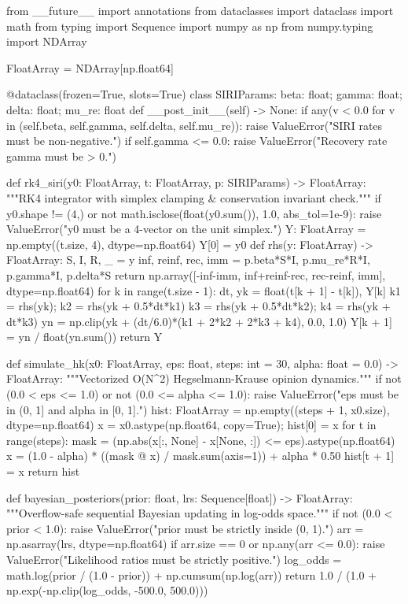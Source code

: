 \begin{ltrcode}[title={CivicShield AI -- Hardened Simulation Core (Python 3.11+ / NumPy)}]
from __future__ import annotations
from dataclasses import dataclass
import math
from typing import Sequence
import numpy as np
from numpy.typing import NDArray

FloatArray = NDArray[np.float64]

@dataclass(frozen=True, slots=True)
class SIRIParams:
    beta: float; gamma: float; delta: float; mu_re: float
    def __post_init__(self) -> None:
        if any(v < 0.0 for v in (self.beta, self.gamma, self.delta, self.mu_re)):
            raise ValueError("SIRI rates must be non-negative.")
        if self.gamma <= 0.0:
            raise ValueError("Recovery rate gamma must be > 0.")

def rk4_siri(y0: FloatArray, t: FloatArray, p: SIRIParams) -> FloatArray:
    """RK4 integrator with simplex clamping & conservation invariant check."""
    if y0.shape != (4,) or not math.isclose(float(y0.sum()), 1.0, abs_tol=1e-9):
        raise ValueError("y0 must be a 4-vector on the unit simplex.")
    Y: FloatArray = np.empty((t.size, 4), dtype=np.float64)
    Y[0] = y0
    def rhs(y: FloatArray) -> FloatArray:
        S, I, R, _ = y
        inf, reinf, rec, imm = p.beta*S*I, p.mu_re*R*I, p.gamma*I, p.delta*S
        return np.array([-inf-imm, inf+reinf-rec, rec-reinf, imm], dtype=np.float64)
    for k in range(t.size - 1):
        dt, yk = float(t[k + 1] - t[k]), Y[k]
        k1 = rhs(yk); k2 = rhs(yk + 0.5*dt*k1)
        k3 = rhs(yk + 0.5*dt*k2); k4 = rhs(yk + dt*k3)
        yn = np.clip(yk + (dt/6.0)*(k1 + 2*k2 + 2*k3 + k4), 0.0, 1.0)
        Y[k + 1] = yn / float(yn.sum())
    return Y

def simulate_hk(x0: FloatArray, eps: float, steps: int = 30, alpha: float = 0.0) -> FloatArray:
    """Vectorized O(N^2) Hegselmann-Krause opinion dynamics."""
    if not (0.0 < eps <= 1.0) or not (0.0 <= alpha <= 1.0):
        raise ValueError("eps must be in (0, 1] and alpha in [0, 1].")
    hist: FloatArray = np.empty((steps + 1, x0.size), dtype=np.float64)
    x = x0.astype(np.float64, copy=True); hist[0] = x
    for t in range(steps):
        mask = (np.abs(x[:, None] - x[None, :]) <= eps).astype(np.float64)
        x = (1.0 - alpha) * ((mask @ x) / mask.sum(axis=1)) + alpha * 0.50
        hist[t + 1] = x
    return hist

def bayesian_posteriors(prior: float, lrs: Sequence[float]) -> FloatArray:
    """Overflow-safe sequential Bayesian updating in log-odds space."""
    if not (0.0 < prior < 1.0):
        raise ValueError("prior must be strictly inside (0, 1).")
    arr = np.asarray(lrs, dtype=np.float64)
    if arr.size == 0 or np.any(arr <= 0.0):
        raise ValueError("Likelihood ratios must be strictly positive.")
    log_odds = math.log(prior / (1.0 - prior)) + np.cumsum(np.log(arr))
    return 1.0 / (1.0 + np.exp(-np.clip(log_odds, -500.0, 500.0)))


\end{ltrcode}
